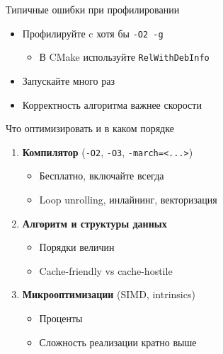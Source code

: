 \documentclass[aspectratio=169, russian]{beamer}
\begin{document}
\begin{frame}{Типичные ошибки при профилировании}
    \begin{itemize}
        \item Профилируйте c хотя бы \texttt{-O2 -g}
              \begin{itemize}
                  \item В CMake используйте \texttt{RelWithDebInfo}
              \end{itemize}

              \bigskip
        \item Запускайте много раз

              \bigskip
        \item Корректность алгоритма важнее скорости

    \end{itemize}
\end{frame}

\begin{frame}{Что оптимизировать и в каком порядке}
    \begin{enumerate}
        \item \textbf{Компилятор} (\texttt{-O2}, \texttt{-O3}, \texttt{-march=<...>})
              \begin{itemize}
                  \item Бесплатно, включайте всегда
                  \item Loop unrolling, инлайнинг, векторизация
              \end{itemize}

              \bigskip
        \item \textbf{Алгоритм и структуры данных}
              \begin{itemize}
                  \item Порядки величин
                  \item Cache-friendly vs cache-hostile
              \end{itemize}

              \bigskip
        \item \textbf{Микрооптимизации} (SIMD, intrinsics)
              \begin{itemize}
                  \item Проценты
                  \item Сложность реализации кратно выше
              \end{itemize}
    \end{enumerate}
\end{frame}
\end{document}

